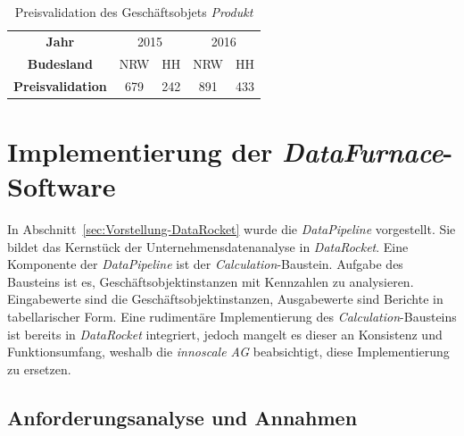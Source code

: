 \documentclass[
  language=german, %
  type=bachelor,%
  ngerman
]{isthesis}
\begin{document}
\begin{content}
  \begin{table}
    \footnotesize
    \begin{tabular}{c c c c c}
      \textbf{Jahr} & \multicolumn{2}{c}{2015} & \multicolumn{2}{c}{2016} \\
      \cmidrule(lr){2-3}\cmidrule(lr){4-5}
      \textbf{Budesland} & NRW & HH & NRW & HH \\
      \toprule
      \textbf{Preisvalidation} & 679 & 242 & 891 & 433 \\
    \end{tabular}
    \caption{Preisvalidation des Geschäftsobjets \textit{Produkt}}\label{table:preisvalidation}
  \end{table}


  \chapter{Implementierung der \textit{DataFurnace}-Software}\label{ch:implementierung-datafurnace}

  In Abschnitt~\ref{sec:Vorstellung-DataRocket} wurde die \textit{DataPipeline}
  vorgestellt. Sie bildet das Kernstück der Unternehmensdatenanalyse in
  \textit{DataRocket}. Eine Komponente der \textit{DataPipeline} ist der
  \textit{Calculation}-Baustein.  Aufgabe des Bausteins ist es,
  Geschäftsobjektinstanzen mit Kennzahlen zu analysieren. Eingabewerte sind die
  Geschäftsobjektinstanzen, Ausgabewerte sind Berichte in tabellarischer Form.
  Eine rudimentäre Implementierung des \textit{Calculation}-Bausteins ist
  bereits in \textit{DataRocket} integriert, jedoch mangelt es dieser an
  Konsistenz und Funktionsumfang, weshalb die \textit{innoscale AG}
  beabsichtigt, diese Implementierung zu ersetzen.

  \section{Anforderungsanalyse und Annahmen}\label{sec:software/anforderungsanalyse}


\end{content}
\end{document}
